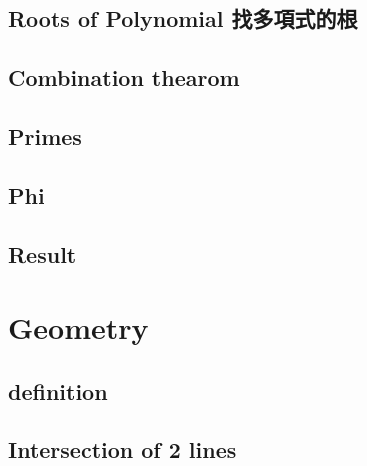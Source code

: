 \documentclass[a4paper,10pt,twocolumn,oneside]{article}
\begin{document}
\subsection{Roots of Polynomial 找多項式的根}


\subsection{Combination thearom}


% 

%

\subsection{Primes}


\subsection{Phi}


\subsection{Result}


\section{Geometry}

% 

\subsection{definition}


\subsection{Intersection of 2 lines}

\end{document}
